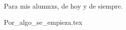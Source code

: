\documentclass[12pt]{book}
\begin{document}
  
  \begin{center}
      \thispagestyle{empty}
      \vspace*{\fill}
      Para mis alumnxs, de hoy y de siempre.
      \vspace*{\fill}
  \end{center}
  \clearpage
  
  \tableofcontents

  \mainmatter
  {Por_algo_se_empieza.tex}
\end{document}
